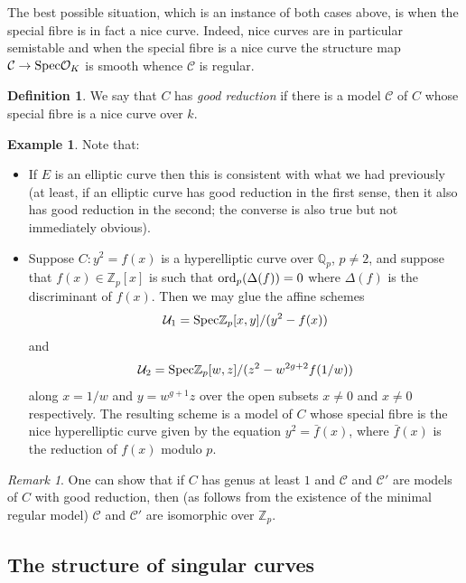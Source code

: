 \documentclass[12pt]{amsart}
\numberwithin{equation}{section}
\theoremstyle{remark}
\newtheorem{remark}[equation]{Remark}
\theoremstyle{definition}
\newtheorem{example}[equation]{Example}
\theoremstyle{definition}
\theoremstyle{definition}
\newtheorem{defi}[equation]{Definition}
\theoremstyle{definition}
\theoremstyle{definition}
\theoremstyle{definition}
\begin{document}
The best possible situation, which is an instance of both cases above, is when the special fibre is in fact a nice curve. Indeed, nice curves are in particular semistable and when the special fibre is a nice curve the structure map $\mathcal{C}\rightarrow \textup{Spec}\mathcal{O}_K$ is smooth whence  $\mathcal{C}$ is regular. 

\begin{defi}
We say that $C$ has \textit{good reduction} if there is a model $\mathcal{C}$ of $C$ whose special fibre is a nice curve over $k$.
\end{defi}

\begin{example}
Note that:

\begin{itemize} 
\item If $E$ is an elliptic curve then this is consistent with what we had previously (at least, if an elliptic curve has good reduction in the first sense, then it also has good reduction in the second; the converse is also true but not immediately obvious). 
\item Suppose $C:y^2=f(x)$ is a hyperelliptic curve over $\mathbb{Q}_p$, $p\neq 2$, and suppose that $f(x)\in \mathbb{Z}_p[x]$ is such that $\textup{ord}_p(\Delta(f))=0$ where $\Delta(f)$ is the discriminant of $f(x)$. Then we may glue the affine schemes
\[\mathcal{U}_1=\textup{Spec}\mathbb{Z}_p[x,y]/(y^2-f(x))\]
and
\[\mathcal{U}_2=\textup{Spec}\mathbb{Z}_p[w,z]/(z^2-w^{2g+2}f(1/w))\]
along $x=1/w$ and $y=w^{g+1}z$ over the open subsets $x\neq 0$ and $x\neq 0$ respectively. The resulting scheme is a model of $C$ whose special fibre is the nice hyperelliptic curve given by the equation $y^2=\bar{f}(x)$, where $\bar{f}(x)$ is the reduction of $f(x)$ modulo $p$.    
\end{itemize}
\end{example}

\begin{remark} 
One can show that if $C$ has genus at least $1$ and $\mathcal{C}$ and $\mathcal{C}'$ are models of $C$ with good reduction, then (as follows from the existence of the minimal regular model)  $\mathcal{C}$ and $\mathcal{C}'$ are isomorphic over $\mathbb{Z}_p$. 
\end{remark}


\subsection{The structure of singular curves}
\end{document}
